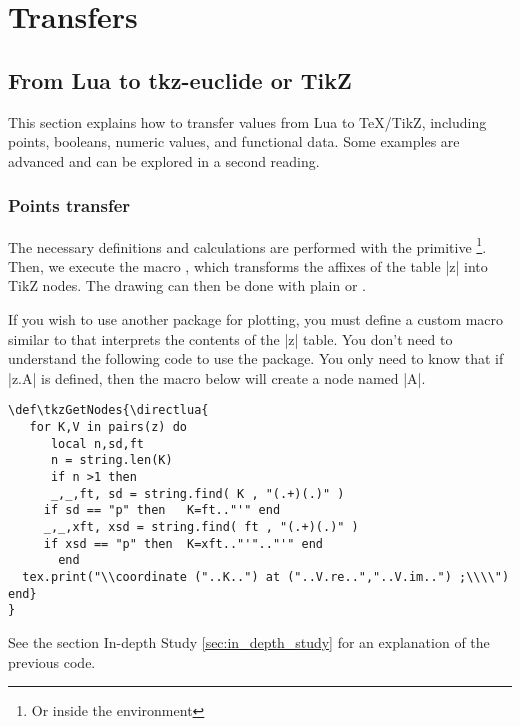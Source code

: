 \newpage
\section{Transfers}

\subsection{From Lua to tkz-euclide or TikZ}

This section explains how to transfer values from Lua to TeX/TikZ, including points, booleans, numeric values, and functional data. Some examples are advanced and can be explored in a second reading.


\subsubsection{Points transfer}
\label{ssub:points_transfer}

The necessary definitions and calculations are performed with the primitive \footnote{Or inside the  environment}. Then, we execute the macro , which transforms the affixes of the table |z| into TikZ nodes. The drawing can then be done with plain \TIKZ{} or .

If you wish to use another package for plotting, you must define a custom macro similar to  that interprets the contents of the |z| table. You don't need to understand the following code to use the package. You only need to know that if |z.A| is defined, then the macro below will create a node named |A|.

\vspace*{1em}
\begin{mybox}
\begin{verbatim}
\def\tkzGetNodes{\directlua{
   for K,V in pairs(z) do
      local n,sd,ft
      n = string.len(K)
      if n >1 then
      _,_,ft, sd = string.find( K , "(.+)(.)" )
     if sd == "p" then   K=ft.."'" end
     _,_,xft, xsd = string.find( ft , "(.+)(.)" )
     if xsd == "p" then  K=xft.."'".."'" end
       end
  tex.print("\\coordinate ("..K..") at ("..V.re..","..V.im..") ;\\\\")
end}
}
\end{verbatim}
\end{mybox}

See the section In-depth Study \ref{sec:in_depth_study} for an explanation of the previous code.


